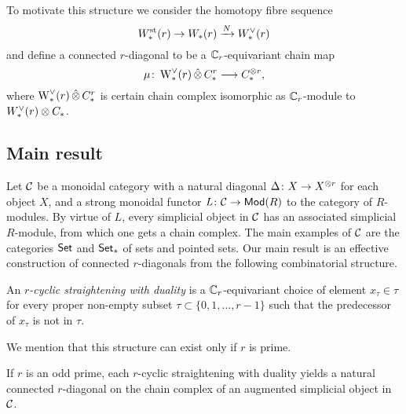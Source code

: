 To motivate this structure we consider the homotopy fibre sequence
\[
W^{\mathrm{st}}_{*}(r) \to W_{*}(r) \xrightarrow{N} W^\vee_{*}(r)
\]
and define a connected $r$-diagonal to be a $\mathbb{C}_r$-equivariant chain map
\[
\mu \colon \operatorname{W}^\vee_{*}(r) \operatorname{\hat{\otimes}} C^{r}_{*} \longrightarrow C_{*}^{\otimes r},
\]
where $\operatorname{W}^\vee_{*}(r) \operatorname{\hat{\otimes}} C^{r}_{*}$ is certain chain complex isomorphic as $\mathbb{C}_r$-module to $W^\vee_{*}(r) \otimes C_{*}$.


\subsection{Main result}

Let $\mathcal{C}$ be a monoidal category with a natural diagonal $\Delta \colon X \to X^{\otimes r}$ for each object $X$, and a strong monoidal functor $\operatorname{{\it L}} \colon \mathcal{C} \to \mathsf{Mod}(R)$ to the category of $R$-modules.
By virtue of $L$, every simplicial object in $\mathcal{C}$ has an associated simplicial $R$-module, from which one gets a chain complex.
The main examples of $\mathcal{C}$ are the categories $\mathsf{Set}$ and $\mathsf{Set}_*$ of sets and pointed sets.
Our main result is an effective construction of connected $r$-diagonals from the following combinatorial structure.

\begin{definition}
	An \emph{$r$-cyclic straightening with duality} is a $\mathbb{C}_r$-equivariant choice of element $x_\tau\in \tau$ for every proper non-empty subset $\tau \subset \{0,1,\dots,r-1\}$ such that the predecessor of $x_\tau$ is not in $\tau$.
\end{definition}

We mention that this structure can exist only if $r$ is prime.

\begin{theorem}\label{thm:main}
	If $r$ is an odd prime, each $r$-cyclic straightening with duality yields a natural connected $r$-diagonal on the chain complex of an augmented simplicial object in $\mathcal{C}$.
\end{theorem}

